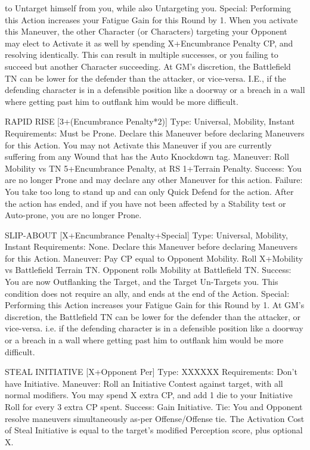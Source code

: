 \documentclass[oneside,11pt,english]{book}
\begin{document}
to Untarget himself from you, while also Untargeting you. 
Special: Performing this Action increases your Fatigue Gain for this Round by 1. 
When you activate this Maneuver, the other Character (or Characters) targeting your Opponent may elect 
to Activate it as well by spending X+Encumbrance Penalty CP, and resolving identically. This can result 
in multiple successes, or you failing to succeed but another Character succeeding. 
At GM’s discretion, the Battlefield TN can be lower for the defender than the attacker, or vice-versa. I.E., 
if the defending character is in a defensible position like a doorway or a breach in a wall where getting 
past him to outflank him would be more difficult. 

 

RAPID RISE [3+(Encumbrance Penalty*2)] 
Type: Universal, Mobility, Instant 
Requirements: Must be Prone. Declare this Maneuver before declaring Maneuvers for this Action. You 
may not Activate this Maneuver if you are currently suffering from any Wound that has the Auto 
Knockdown tag. 
Maneuver: Roll Mobility vs TN 5+Encumbrance Penalty, at RS 1+Terrain Penalty. 
Success: You are no longer Prone and may declare any other Maneuver for this action. 
Failure: You take too long to stand up and can only Quick Defend for the action. After the action has 
ended, and if you have not been affected by a Stability test or Auto-prone, you are no longer Prone. 

 

SLIP-ABOUT [X+Encumbrance Penalty+Special] 
Type: Universal, Mobility, Instant 
Requirements: None. Declare this Maneuver before declaring Maneuvers for this Action. 
Maneuver: Pay CP equal to Opponent Mobility. Roll X+Mobility vs Battlefield Terrain TN. Opponent 
rolls Mobility at Battlefield TN. 
Success: You are now Outflanking the Target, and the Target Un-Targets you. This condition does not 
require an ally, and ends at the end of the Action. 
Special: Performing this Action increases your Fatigue Gain for this Round by 1. 
At GM’s discretion, the Battlefield TN can be lower for the defender than the attacker, or vice-versa. i.e. 
if the defending character is in a defensible position like a doorway or a breach in a wall where getting 
past him to outflank him would be more difficult. 

 

STEAL INITIATIVE [X+Opponent Per] 
Type: XXXXXX 
Requirements: Don't have Initiative. 
Maneuver: Roll an Initiative Contest against target, with all normal modifiers. You may spend X extra 
CP, and add 1 die to your Initiative Roll for every 3 extra CP spent. 
Success: Gain Initiative. 
Tie: You and Opponent resolve maneuvers simultaneously as-per Offense/Offense tie. 
The Activation Cost of Steal Initiative is equal to the target's modified Perception score, plus optional X. 
\end{document}
